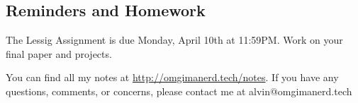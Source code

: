 \documentclass[letterpaper, 12pt]{article}
\begin{document}
\subsection*{Reminders and Homework}
The Lessig Assignment is due Monday, April 10th at 11:59PM.
Work on your final paper and projects.

\begin{center}
  You can find all my notes at \url{http://omgimanerd.tech/notes}. If you have
  any questions, comments, or concerns, please contact me at
  alvin@omgimanerd.tech
\end{center}
\end{document}
